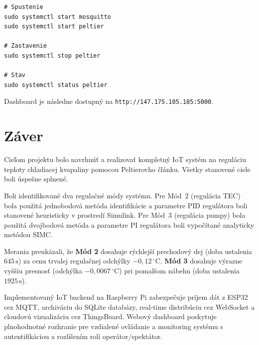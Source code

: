 \begin{verbatim}
# Spustenie
sudo systemctl start mosquitto
sudo systemctl start peltier

# Zastavenie
sudo systemctl stop peltier

# Stav
sudo systemctl status peltier
\end{verbatim}

Dashboard je následne dostupný na \texttt{http://147.175.105.185:5000}.

\section{Záver}

Cieľom projektu bolo navrhnúť a realizovať kompletný IoT systém na reguláciu teploty chladiacej kvapaliny pomocou Peltierovho článku. Všetky stanovené ciele boli úspešne splnené.

Boli identifikované dva regulačné módy systému. Pre Mód~2 (regulácia TEC) bola použitá jednobodová metóda identifikácie a parametre PID regulátora boli stanovené heuristicky v prostredí Simulink. Pre Mód~3 (regulácia pumpy) bola použitá dvojbodová metóda a parametre PI regulátora boli vypočítané analyticky metódou SIMC.

Merania preukázali, že \textbf{Mód 2} dosahuje rýchlejší prechodový dej (doba ustalenia $645\,\text{s}$) za cenu trvalej regulačnej odchýlky $-0{,}12\,^\circ\text{C}$. \textbf{Mód 3} dosahuje výrazne vyššiu presnosť (odchýlka $-0{,}0067\,^\circ\text{C}$) pri pomalšom nábehu (doba ustalenia $1925\,\text{s}$).

Implementovaný IoT backend na Raspberry Pi zabezpečuje príjem dát z ESP32 cez MQTT, archiváciu do SQLite databázy, real-time distribúciu cez WebSocket a cloudovú vizualizáciu cez ThingsBoard. Webový dashboard poskytuje plnohodnotné rozhranie pre vzdialené ovládanie a monitoring systému s autentifikáciou a rozlíšením rolí operátor/spektátor.

